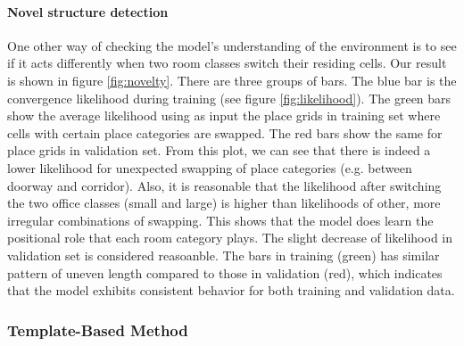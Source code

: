 \documentclass[10pt, titlepage]{article}
\theoremstyle{definition}
\begin{document}
\paragraph{Novel structure detection} One other way of checking the model's understanding of the environment is to see if it acts differently when two room classes switch their residing cells. Our result is shown in figure \ref{fig:novelty}. There are three groups of bars. The blue bar is the convergence likelihood during training (see figure \ref{fig:likelihood}). The green bars show the average likelihood using as input the place grids in training set where cells with certain place categories are swapped. The red bars show the same for place grids in validation set. From this plot, we can see that there is indeed a lower likelihood for unexpected swapping of place categories (e.g. between doorway and corridor). Also, it is reasonable that the likelihood after switching the two office classes (small and large) is higher than likelihoods of other, more irregular combinations of swapping. This shows that the model does learn the positional role that each room category plays. The slight decrease of likelihood in validation set is considered reasoanble. The bars in training (green) has similar pattern of  uneven length compared to those in validation (red), which indicates that the model exhibits consistent behavior for both training and validation data.

\subsubsection{Template-Based Method}
\end{document}
